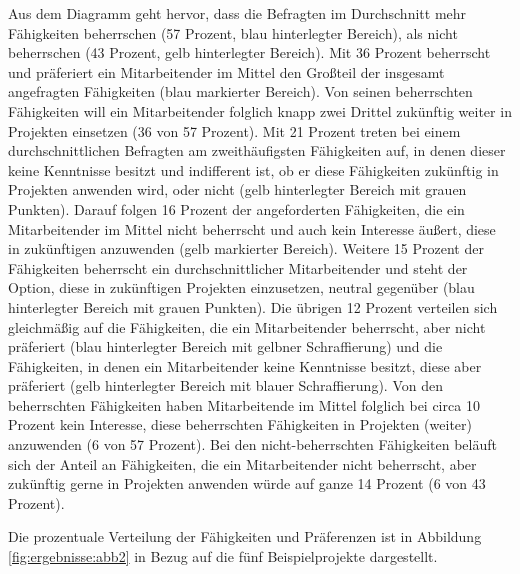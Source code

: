 Aus dem Diagramm geht hervor, dass die Befragten im Durchschnitt mehr Fähigkeiten beherrschen (57 Prozent, blau hinterlegter Bereich), als nicht beherrschen (43 Prozent, gelb hinterlegter Bereich).
Mit 36 Prozent beherrscht und präferiert ein Mitarbeitender im Mittel den Großteil der insgesamt angefragten Fähigkeiten (blau markierter Bereich).
Von seinen beherrschten Fähigkeiten will ein Mitarbeitender folglich knapp zwei Drittel zukünftig weiter in Projekten einsetzen (36 von 57 Prozent).
Mit 21 Prozent treten bei einem durchschnittlichen Befragten am zweithäufigsten Fähigkeiten auf, in denen dieser keine Kenntnisse besitzt und indifferent ist, ob er diese Fähigkeiten zukünftig in Projekten anwenden wird, oder nicht (gelb hinterlegter Bereich mit grauen Punkten).
Darauf folgen 16 Prozent der angeforderten Fähigkeiten, die ein Mitarbeitender im Mittel nicht beherrscht und auch kein Interesse äußert, diese in zukünftigen anzuwenden (gelb markierter Bereich).
Weitere 15 Prozent der Fähigkeiten beherrscht ein durchschnittlicher Mitarbeitender und steht der Option, diese in zukünftigen Projekten einzusetzen, neutral gegenüber (blau hinterlegter Bereich mit grauen Punkten). 
Die übrigen 12 Prozent verteilen sich gleichmäßig auf die Fähigkeiten, die ein Mitarbeitender beherrscht, aber nicht präferiert (blau hinterlegter Bereich mit gelbner Schraffierung) und die Fähigkeiten, in denen ein Mitarbeitender keine Kenntnisse besitzt, diese aber präferiert (gelb hinterlegter Bereich mit blauer Schraffierung).
Von den beherrschten Fähigkeiten haben Mitarbeitende im Mittel folglich bei circa 10 Prozent kein Interesse, diese beherrschten Fähigkeiten in Projekten (weiter) anzuwenden (6 von 57 Prozent).
Bei den nicht-beherrschten Fähigkeiten beläuft sich der Anteil an Fähigkeiten, die ein Mitarbeitender nicht beherrscht, aber zukünftig gerne in Projekten anwenden würde auf ganze 14 Prozent (6 von 43 Prozent).

Die prozentuale Verteilung der Fähigkeiten und Präferenzen ist in Abbildung \ref{fig:ergebnisse:abb2} in Bezug auf die fünf Beispielprojekte dargestellt.

